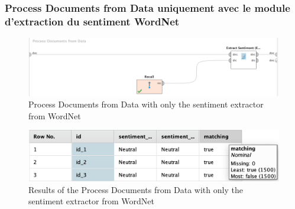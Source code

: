 \documentclass[a4paper]{article}
\begin{document}
\subsubsection{Process Documents from Data uniquement avec le module d'extraction du sentiment WordNet}
\begin{figure}[H]
	\includegraphics[width=\linewidth]{imgs/part_3/3_processing_documents_no_stem_filter_token_stopword_transform_tokens}
	\caption{Process Documents from Data with only the sentiment extractor from WordNet}
	\label{fig:3_processing_documents_no_stem_filter_token_stopword_transform_tokens}
\end{figure}
\begin{figure}[H]
	\includegraphics[width=\linewidth]{imgs/part_3/3_processing_documents_no_stem_filter_token_stopword_transform_tokens_results}
	\caption{Results of the Process Documents from Data with only the sentiment extractor from WordNet}
	\label{fig:3_processing_documents_no_stem_filter_token_stopword_transform_tokens_results}
\end{figure}
\end{document}
